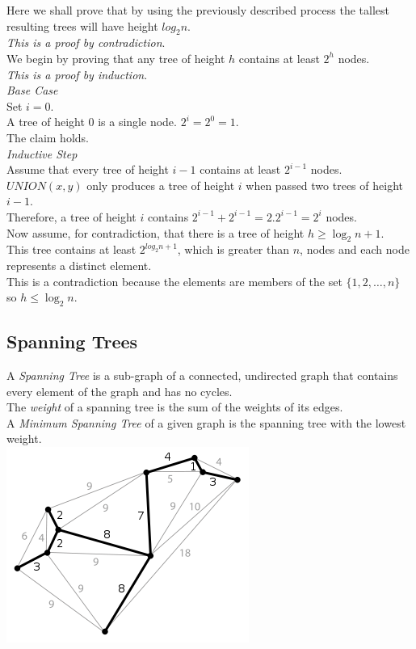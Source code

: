 \documentclass[11pt,a4paper]{article}
\begin{document}
Here we shall prove that by using the previously described process the tallest resulting trees will have height $log_2n$.\\
\textit{This is a proof by contradiction}.\\
We begin by proving that any tree of height $h$ contains at least $2^h$ nodes.\\
\textit{This is a proof by induction}.\\
\textit{Base Case}\\
Set $i=0$.\\
A tree of height $0$ is a single node. $2^i=2^0=1$.\\
The claim holds.\\
\textit{Inductive Step}\\
Assume that every tree of height $i-1$ contains at least $2^{i-1}$ nodes.\\
$UNION(x,y)$ only produces a tree of height $i$ when passed two trees of height $i-1$.\\
Therefore, a tree of height $i$ contains $2^{i-1}+2^{i-1}=2.2^{i-1}=2^i$ nodes.\\
Now assume, for contradiction, that there is a tree of height $h\geq\log_2n+1$.\\
This tree contains at least $2^{log_2n+1}$, which is greater than $n$, nodes and each node represents a distinct element.\\
This is a contradiction because the elements are members of the set $\{1,2,\dots,n\}$ so $h\leq\log_2n$.

\subsection{Spanning Trees}

A \textit{Spanning Tree} is a sub-graph of a connected, undirected graph that contains every element of the graph and has no cycles.\\

The \textit{weight} of a spanning tree is the sum of the weights of its edges.\\

A \textit{Minimum Spanning Tree} of a given graph is the spanning tree with the lowest weight.\\

\newpage
{}
\includegraphics[scale=0.4]{minimumSpanningTree}
\end{document}
